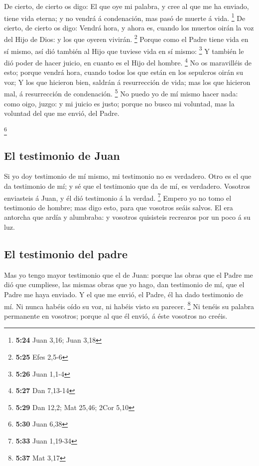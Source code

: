  De cierto, de cierto os digo: El que oye mi palabra, y
cree al que me ha enviado, tiene vida eterna; y no vendrá á condenación,
mas pasó de muerte á vida. \footnote{\textbf{5:24} Juan 3,16; Juan 3,18}
 De cierto, de cierto os digo: Vendrá hora, y ahora es,
cuando los muertos oirán la voz del Hijo de Dios: y los que oyeren
vivirán. \footnote{\textbf{5:25} Efes 2,5-6}  Porque como
el Padre tiene vida en sí mismo, así dió también al Hijo que tuviese
vida en sí mismo: \footnote{\textbf{5:26} Juan 1,1-4}  Y
también le dió poder de hacer juicio, en cuanto es el Hijo del hombre.
\footnote{\textbf{5:27} Dan 7,13-14}  No os maravilléis
de esto; porque vendrá hora, cuando todos los que están en los sepulcros
oirán su voz;  Y los que hicieron bien, saldrán á
resurrección de vida; mas los que hicieron mal, á resurrección de
condenación. \footnote{\textbf{5:29} Dan 12,2; Mat 25,46; 2Cor 5,10}
 No puedo yo de mí mismo hacer nada: como oigo, juzgo: y
mi juicio es justo; porque no busco mi voluntad, mas la voluntad del que
me envió, del Padre.

\footnote{\textbf{5:30} Juan 6,38}

\hypertarget{el-testimonio-de-juan}{%
\subsection{El testimonio de Juan}\label{el-testimonio-de-juan}}

 Si yo doy testimonio de mí mismo, mi testimonio no es
verdadero.  Otro es el que da testimonio de mí; y sé que
el testimonio que da de mí, es verdadero.  Vosotros
enviasteis á Juan, y él dió testimonio á la verdad. \footnote{\textbf{5:33}
  Juan 1,19-34}  Empero yo no tomo el testimonio de
hombre; mas digo esto, para que vosotros seáis salvos. 
El era antorcha que ardía y alumbraba: y vosotros quisisteis recrearos
por un poco á su luz.

\hypertarget{el-testimonio-del-padre}{%
\subsection{El testimonio del padre}\label{el-testimonio-del-padre}}

 Mas yo tengo mayor testimonio que el de Juan: porque las
obras que el Padre me dió que cumpliese, las mismas obras que yo hago,
dan testimonio de mí, que el Padre me haya enviado.  Y el
que me envió, el Padre, él ha dado testimonio de mí. Ni nunca habéis
oído su voz, ni habéis visto su parecer. \footnote{\textbf{5:37} Mat
  3,17}  Ni tenéis su palabra permanente en vosotros;
porque al que él envió, á éste vosotros no creéis.

